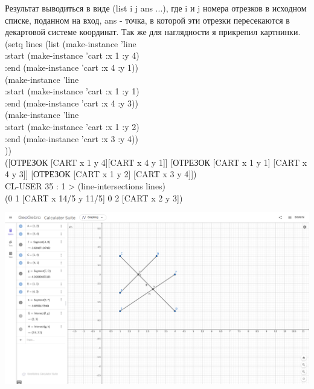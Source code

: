 \documentclass[12pt]{article}
\begin{document}
{\large 
	Результат выводиться в виде (list i j ans ...), где i и j номера отрезков в исходном списке, 
	поданном на вход, ans - точка, в которой эти отрезки пересекаются в декартовой системе координат. Так же
	для наглядности я прикрепил картнинки. \\

(setq lines (list (make-instance 'line \\
                   :start (make-instance 'cart :x 1 :y 4) \\
                   :end (make-instance 'cart :x 4 :y 1)) \\
					(make-instance 'line \\
                   :start (make-instance 'cart :x 1 :y 1) \\
                   :end (make-instance 'cart :x 4 :y 3)) \\
					(make-instance 'line \\
                   :start (make-instance 'cart :x 1 :y 2) \\
                   :end (make-instance 'cart :x 3 :y 4)) \\
					)) \\
([ОТРЕЗОК [CART x 1 y 4][CART x 4 y 1]] [ОТРЕЗОК [CART x 1 y 1] [CART x 4 y 3]] [ОТРЕЗОК [CART x 1 y 2] [CART x 3 y 4]]) \\

CL-USER 35 : 1 >  
(line-intersections lines) \\
(0 1 [CART x 14/5 y 11/5] 0 2 [CART x 2 y 3])

\includegraphics[scale=0.3]{1.png}

}
\end{document}
